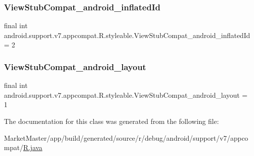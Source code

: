 \subsubsection{\texorpdfstring{View\+Stub\+Compat\+\_\+android\+\_\+inflated\+Id}{ViewStubCompat\_android\_inflatedId}}
{\footnotesize\ttfamily final int android.\+support.\+v7.\+appcompat.\+R.\+styleable.\+View\+Stub\+Compat\+\_\+android\+\_\+inflated\+Id = 2\hspace{0.3cm}{\ttfamily [static]}}

\mbox{\label{classandroid_1_1support_1_1v7_1_1appcompat_1_1R_1_1styleable_a1850da4fab00e8c58cb80eccbffa9339}} 
\subsubsection{\texorpdfstring{View\+Stub\+Compat\+\_\+android\+\_\+layout}{ViewStubCompat\_android\_layout}}
{\footnotesize\ttfamily final int android.\+support.\+v7.\+appcompat.\+R.\+styleable.\+View\+Stub\+Compat\+\_\+android\+\_\+layout = 1\hspace{0.3cm}{\ttfamily [static]}}



The documentation for this class was generated from the following file\+:\begin{DoxyCompactItemize}
\item 
Market\+Master/app/build/generated/source/r/debug/android/support/v7/appcompat/\mbox{\hyperlink{debug_2android_2support_2v7_2appcompat_2R_8java}{R.\+java}}\end{DoxyCompactItemize}
